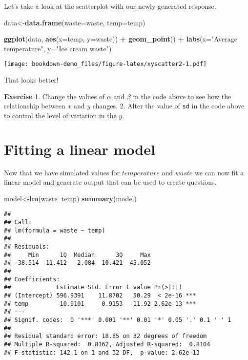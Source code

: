 \documentclass[
]{book}
\newenvironment{Shaded}{\begin{snugshade}}{\end{snugshade}}
\newcommand{\DataTypeTok}[1]{\textcolor[rgb]{0.13,0.29,0.53}{#1}}
\newcommand{\KeywordTok}[1]{\textcolor[rgb]{0.13,0.29,0.53}{\textbf{#1}}}
\newcommand{\NormalTok}[1]{#1}
\newcommand{\OperatorTok}[1]{\textcolor[rgb]{0.81,0.36,0.00}{\textbf{#1}}}
\newcommand{\StringTok}[1]{\textcolor[rgb]{0.31,0.60,0.02}{#1}}
\begin{document}
Let's take a look at the scatterplot with our newly generated response.

\begin{Shaded}
\begin{Highlighting}[]
\NormalTok{data<-}\KeywordTok{data.frame}\NormalTok{(}\DataTypeTok{waste=}\NormalTok{waste, }\DataTypeTok{temp=}\NormalTok{temp)}

\KeywordTok{ggplot}\NormalTok{(data, }\KeywordTok{aes}\NormalTok{(}\DataTypeTok{x=}\NormalTok{temp, }\DataTypeTok{y=}\NormalTok{waste)) }\OperatorTok{+}\StringTok{ }
\StringTok{  }\KeywordTok{geom_point}\NormalTok{() }\OperatorTok{+}\StringTok{ }
\StringTok{  }\KeywordTok{labs}\NormalTok{(}\DataTypeTok{x=}\StringTok{"Average temperature"}\NormalTok{, }\DataTypeTok{y=}\StringTok{"Ice cream waste"}\NormalTok{)}
\end{Highlighting}
\end{Shaded}

\texttt{[image: bookdown-demo\_files/figure-latex/xyscatter2-1.pdf]}

That looks better!

\textbf{Exercise}
1. Change the values of \(\alpha\) and \(\beta\) in the code above to see how the relationship between \(x\) and \(y\) changes.
2. Alter the value of \texttt{sd} in the code above to control the level of variation in the \(y\).

\hypertarget{fitting-a-linear-model}{%
\section{Fitting a linear model}\label{fitting-a-linear-model}}

Now that we have simulated values for \(temperature\) and \(waste\) we can now fit a linear model and generate output that can be used to create questions.

\begin{Shaded}
\begin{Highlighting}[]
\NormalTok{model<-}\KeywordTok{lm}\NormalTok{(waste}\OperatorTok{~}\NormalTok{temp)}
\KeywordTok{summary}\NormalTok{(model)}
\end{Highlighting}
\end{Shaded}

\begin{verbatim}
## 
## Call:
## lm(formula = waste ~ temp)
## 
## Residuals:
##     Min      1Q  Median      3Q     Max 
## -38.514 -11.412  -2.084  10.421  45.052 
## 
## Coefficients:
##             Estimate Std. Error t value Pr(>|t|)    
## (Intercept) 596.9391    11.8702   50.29  < 2e-16 ***
## temp        -10.9101     0.9153  -11.92 2.62e-13 ***
## ---
## Signif. codes:  0 '***' 0.001 '**' 0.01 '*' 0.05 '.' 0.1 ' ' 1
## 
## Residual standard error: 18.85 on 32 degrees of freedom
## Multiple R-squared:  0.8162, Adjusted R-squared:  0.8104 
## F-statistic: 142.1 on 1 and 32 DF,  p-value: 2.62e-13
\end{verbatim}
\end{document}
